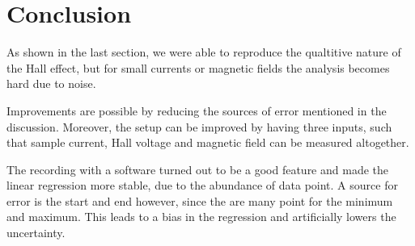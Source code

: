 \section{Conclusion}
\label{sec:conclusion}
As shown in the last section, we were able to reproduce the qualtitive nature of the Hall effect,
but for small currents or magnetic fields the analysis becomes hard due to noise. 

Improvements are possible by reducing the sources of error mentioned in the discussion. Moreover,
the setup can be improved by having three inputs, such that sample current, Hall voltage and
magnetic field can be measured altogether. 

The recording with a software turned out to be a good
feature and made the linear regression more stable, due to the abundance of data point. A source for
error is the start and end however, since the are many point for the minimum and maximum. This leads
to a bias in the regression and artificially lowers the uncertainty.

